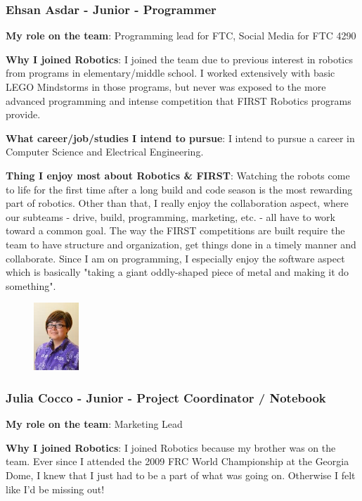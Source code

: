 \subsubsection{Ehsan Asdar - Junior - Programmer} 
{\bf My role on the team}: Programming lead for FTC, Social Media for FTC 4290

{\bf Why I joined Robotics}: I joined the team due to previous interest in robotics from programs in elementary/middle school. I worked extensively with basic LEGO Mindstorms in those programs, but never was exposed to the more advanced programming and intense competition that FIRST Robotics programs provide.
	    
{\bf What career/job/studies I intend to pursue}: I intend to pursue a career in Computer Science and Electrical Engineering.
	
{\bf Thing I enjoy most about Robotics \& FIRST}: Watching the robots come to life for the first time after a long build and code season is the most rewarding part of robotics. Other than that, I really enjoy the collaboration aspect, where our subteams - drive, build, programming, marketing, etc. - all have to work toward a common goal.  The way the FIRST competitions are built require the team to have structure and organization, get things done in a timely manner and collaborate. Since I am on programming, I especially enjoy the software aspect which is basically "taking a giant oddly-shaped piece of metal and making it do something".

\begin{figure}
	\centering
	\includegraphics[height=1in]{julia}
\end{figure}
\subsubsection{Julia Cocco - Junior - Project Coordinator / Notebook}
{\bf My role on the team}: Marketing Lead

{\bf Why I joined Robotics}: I joined Robotics because my brother was on the team. Ever since I attended the 2009 FRC World Championship at the Georgia Dome, I knew that I just had to be a part of what was going on. Otherwise I felt like I'd be missing out! 

